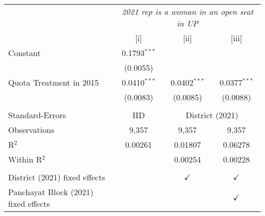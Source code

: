 
\begingroup
\centering
\begin{tabular}{lccc}
   \toprule
    & \multicolumn{3}{c}{\textit{2021 rep is a woman in an open seat in UP}}\\
                                        & [i]            & [ii]           & [iii]\\  
   \midrule 
   Constant                             & 0.1793$^{***}$ &                &   \\   
                                        & (0.0055)       &                &   \\   
   Quota Treatment in 2015              & 0.0410$^{***}$ & 0.0402$^{***}$ & 0.0377$^{***}$\\   
                                        & (0.0083)       & (0.0085)       & (0.0088)\\   
    \\
   Standard-Errors & IID & \multicolumn{2}{c}{District (2021)} \\ 
   Observations                         & 9,357          & 9,357          & 9,357\\  
   R$^2$                                & 0.00261        & 0.01807        & 0.06278\\  
   Within R$^2$                         &                & 0.00254        & 0.00228\\  
    \\
   District (2021) fixed effects        &                & $\checkmark$   & $\checkmark$\\   
   Panchayat Block (2021) fixed effects &                &                & $\checkmark$\\   
   \bottomrule
\end{tabular}
\par\endgroup


